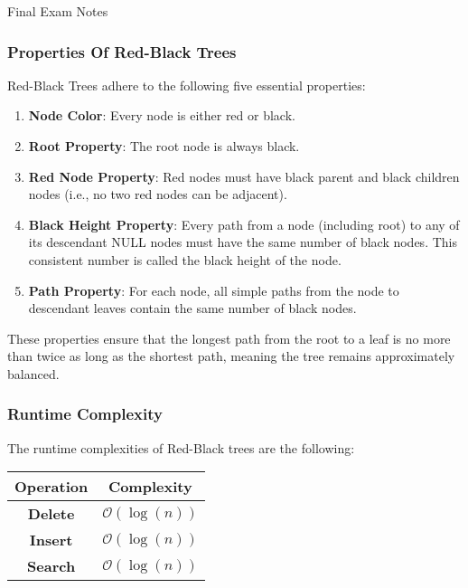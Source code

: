\begin{examnotes}{Final Exam Notes}
    \subsubsection*{Properties Of Red-Black Trees}

    Red-Black Trees adhere to the following five essential properties:

    \begin{enumerate}
        \item \textbf{Node Color}: Every node is either red or black.
        \item \textbf{Root Property}: The root node is always black.
        \item \textbf{Red Node Property}: Red nodes must have black parent and black children nodes (i.e., no two red nodes can be adjacent).
        \item \textbf{Black Height Property}: Every path from a node (including root) to any of its descendant NULL nodes must have the same number of black nodes. This consistent number is called 
        the black height of the node.
        \item \textbf{Path Property}: For each node, all simple paths from the node to descendant leaves contain the same number of black nodes.
    \end{enumerate}

    These properties ensure that the longest path from the root to a leaf is no more than twice as long as the shortest path, meaning the tree remains approximately balanced.

    \subsubsection*{Runtime Complexity}

    The runtime complexities of Red-Black trees are the following:

    \begin{center}
        \begin{tabular}[ht]{|c|c|}
            \hline \textbf{Operation} & \textbf{Complexity} \\ \hline
            \textbf{Delete} & $\mathcal{O}(\log{(n)})$ \\ \hline
            \textbf{Insert} & $\mathcal{O}(\log{(n)})$ \\ \hline
            \textbf{Search} & $\mathcal{O}(\log{(n)})$ \\ \hline
        \end{tabular}
    \end{center}


\end{examnotes}
